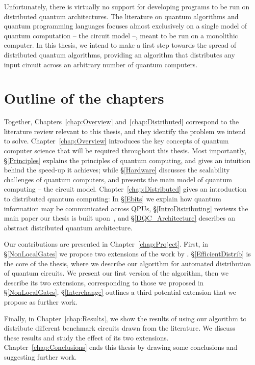 Unfortunately, there is virtually no support for developing programs to be run on distributed quantum architectures. The literature on quantum algorithms and quantum programming languages focuses almost exclusively on a single model of quantum computation -- the circuit model --, meant to be run on a monolithic computer. In this thesis, we intend to make a first step towards the spread of distributed quantum algorithms, providing an algorithm that distributes any input circuit across an arbitrary number of quantum computers.

\section{Outline of the chapters}

Together, Chapters~\ref{chap:Overview} and~\ref{chap:Distributed} correspond to the literature review relevant to this thesis, and they identify the problem we intend to solve. Chapter~\ref{chap:Overview} introduces the key concepts of quantum computer science that will be required throughout this thesis. Most importantly, \S\ref{Principles} explains the principles of quantum computing, and gives an intuition behind the speed-up it achieves; while \S\ref{Hardware} discusses the scalability challenges of quantum computers, and presents the main model of quantum computing -- the circuit model. Chapter~\ref{chap:Distributed} gives an introduction to distributed quantum computing: In \S\ref{Ebits} we explain how quantum information may be communicated across QPUs, \S\ref{IntroDistributing} reviews the main paper our thesis is built upon~\citep{NonLocalCNOT}, and \S\ref{DQC_Architecture} describes an abstract distributed quantum architecture.

Our contributions are presented in Chapter~\ref{chap:Project}. First, in \S\ref{NonLocalGates} we propose two extensions of the work by \citet{NonLocalCNOT}. \S\ref{EfficientDistrib} is the core of the thesis, where we describe our algorithm for automated distribution of quantum circuits. We present our first version of the algorithm, then we describe its two extensions, corresponding to those we proposed in \S\ref{NonLocalGates}. \S\ref{Interchange} outlines a third potential extension that we propose as further work.

Finally, in Chapter~\ref{chap:Results}, we show the results of using our algorithm to distribute different benchmark circuits drawn from the literature. We discuss these results and study the effect of its two extensions. Chapter~\ref{chap:Conclusions} ends this thesis by drawing some conclusions and suggesting further work.